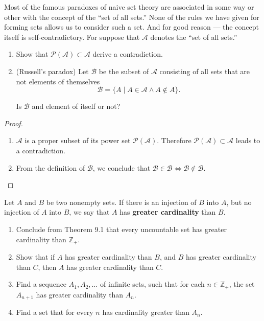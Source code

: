 \begin{exercise}\label{chapter1:section9:exercise6}
    Most of the famous paradoxes of naive set theory are associated in some way or other with the concept of the ``set of all sets{.}'' None of the rules we have given for forming sets allows us to consider such a set. And for good reason --- the concept itself is self-contradictory. For suppose that $\mathscr{A}$ denotes the ``set of all sets{.}''
    \begin{enumerate}[label={(\alph*)}]
        \item Show that $\mathscr{P}(\mathscr{A})\subset \mathscr{A}$ derive a contradiction.
        \item (Russell's paradox) Let $\mathscr{B}$ be the subset of $\mathscr{A}$ consisting of all sets that are not elements of themselves
              \[
                  \mathscr{B} = \{ A \mid A\in\mathscr{A} \land A\notin A \}.
              \]

              Is $\mathscr{B}$ and element of itself or not?
    \end{enumerate}
\end{exercise}

\begin{proof}
    \begin{enumerate}[label={(\alph*)}]
        \item $\mathscr{A}$ is a proper subset of its power set $\mathscr{P}(\mathscr{A})$. Therefore $\mathscr{P}(\mathscr{A})\subset \mathscr{A}$ leads to a contradiction.
        \item From the definition of $\mathscr{B}$, we conclude that $\mathscr{B}\in\mathscr{B}\Longleftrightarrow \mathscr{B}\notin\mathscr{B}$.
    \end{enumerate}
\end{proof}

\begin{exercise}\label{chapter1:section9:exercise7}
    Let $A$ and $B$ be two nonempty sets. If there is an injection of $B$ into $A$, but no injection of $A$ into $B$, we say that $A$ has \textbf{greater cardinality} than $B$.
    \begin{enumerate}[label={(\alph*)}]
        \item Conclude from Theorem 9.1 that every uncountable set has greater cardinality than $\mathbb{Z}_{+}$.
        \item Show that if $A$ has greater cardinality than $B$, and $B$ has greater cardinality than $C$, then $A$ has greater cardinality than $C$.
        \item Find a sequence $A_{1}, A_{2}, \ldots$ of infinite sets, such that for each $n\in\mathbb{Z}_{+}$, the set $A_{n+1}$ has greater cardinality than $A_{n}$.
        \item Find a set that for every $n$ has cardinality greater than $A_{n}$.
    \end{enumerate}
\end{exercise}

